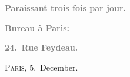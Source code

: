 \pstart
           \begin{otherlanguage}{french}\textcolor{gray}{\textbf{\textbf{Paraissant trois fois par jour.}}}\end{otherlanguage}\pend
           
\pstart
           \begin{otherlanguage}{french}\textcolor{gray}{\textbf{\textbf{Bureau à Paris:}}}\end{otherlanguage}\pend
           
\pstart
           \begin{otherlanguage}{french}\textcolor{gray}{\textbf{\textbf{24. Rue Feydeau.}}}\end{otherlanguage}\hfill \textsc{Paris}, 5. December.\pend
           
